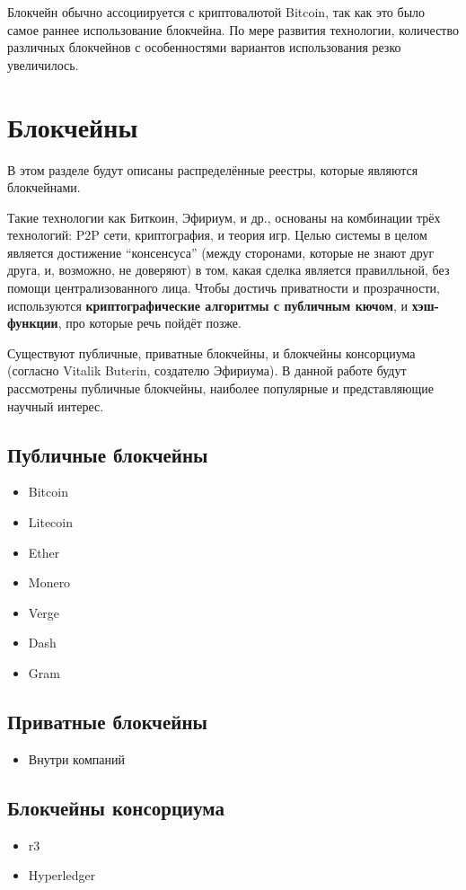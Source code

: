 \documentclass[russian, a4paper, 12pt]{article}
\begin{document}
Блокчейн обычно ассоциируется с криптовалютой Bitcoin, так как это было самое
раннее использование блокчейна. По мере развития технологии, количество
различных блокчейнов с особенностями вариантов использования резко увеличилось.

\section{Блокчейны}
В этом разделе будут описаны распределённые реестры, которые являются
блокчейнами.


Такие технологии как Биткоин, Эфириум, и др., основаны на комбинации трёх
технологий: P2P сети, криптография, и теория игр. Целью системы в целом
является достижение ``консенсуса'' (между сторонами, которые не знают друг
друга, и, возможно, не доверяют) в том, какая сделка является правилльной, без
помощи централизованного лица. Чтобы достичь приватности и прозрачности,
используются \textbf{криптографические алгоритмы с публичным кючом}, и
\textbf{хэш-функции}, про которые речь пойдёт позже.

Существуют публичные, приватные блокчейны, и блокчейны консорциума (согласно
Vitalik Buterin, создателю Эфириума). В данной работе будут рассмотрены
публичные блокчейны, наиболее популярные и представляющие научный интерес.

\subsection{Публичные блокчейны}
\begin{itemize}
    \item Bitcoin
    \item Litecoin
    \item Ether
    \item Monero
    \item Verge
    \item Dash
    \item Gram
\end{itemize}

\subsection{Приватные блокчейны}
\begin{itemize}
    \item Внутри компаний
\end{itemize}

\subsection{Блокчейны консорциума}
\begin{itemize}
    \item r3
    \item Hyperledger
\end{itemize}
\end{document}
